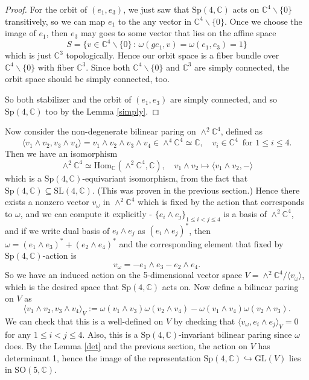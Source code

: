 \documentclass{article}
\newcommand{\SO}{\mathrm{SO}}
\newcommand{\SL}{\mathrm{SL}}
\newcommand{\GL}{\mathrm{GL}}
\newcommand{\Sp}{\mathrm{Sp}}
\newcommand{\Hom}{\mathrm{Hom}}
\begin{document}
\begin{proof}
For the orbit of $(e_{1}, e_{3})$, we just saw that $\Sp(4, \mathbb{C})$ acts on $\mathbb{C}^{4}\backslash\{0\}$ transitively, so we can map $e_{1}$ to the any vector in $\mathbb{C}^{4}\backslash\{0\}$. Once we choose the image of $e_{1}$, then $e_{3}$ may goes to some vector that lies on the affine space $$S = \{v\in \mathbb{C}^{4}\backslash\{0\}\,:\, \omega(ge_{1}, v) = \omega(e_{1}, e_{3})=1\}$$
which is just $\mathbb{C}^{3}$ topologically. 
Hence our orbit space is a fiber bundle over $\mathbb{C}^{4}\backslash\{0\}$ with fiber $\mathbb{C}^{3}$. Since both $\mathbb{C}^{4}\backslash\{0\}$ and $\mathbb{C}^{3}$ are simply connected, the orbit space should be simply connected, too. 

So both stabilizer and the orbit of $(e_{1}, e_{3})$ are simply connected, and so $\Sp(4, \mathbb{C})$ too by the Lemma \ref{simply}. 
\end{proof}
Now consider the  non-degenerate bilinear paring on $\wedge^{2}\mathbb{C}^{4}$, defined as
$$
\langle v_{1}\wedge v_{2}, v_{3}\wedge v_{4}\rangle = v_{1}\wedge v_{2}\wedge v_{3}\wedge v_{4}\in \wedge^{4}\mathbb{C}^{4}\simeq \mathbb{C}, \quad v_{i}\in\mathbb{C}^{4}\,\text{ for }1\leq i\leq 4. 
$$ 
Then we have an isomorphism 
$$
\wedge^{2}\mathbb{C}^{4}\simeq \Hom_{\mathbb{C}}(\wedge^{2}\mathbb{C}^{4}, \mathbb{C}), \quad v_{1}\wedge v_{2}\mapsto \langle v_{1}\wedge v_{2}, -\rangle 
$$
which is a $\Sp(4, \mathbb{C})$-equivariant isomorphism, from the fact that $\Sp(4, \mathbb{C})\subseteq \SL(4, \mathbb{C})$. (This was proven in the previous section.) 
Hence there exists a nonzero vector $v_{\omega}$ in $\wedge^{2}\mathbb{C}^{4}$ which is fixed by the action that corresponds to $\omega$, and we can compute it explicitly - $\{e_{i}\wedge e_{j}\}_{1\leq i<j\leq 4}$ is a basis of $\wedge^{2}\mathbb{C}^{4}$, and if we write dual basis of $e_{i}\wedge e_{j}$ as $(e_{i}\wedge e_{j})^{*}$, then $\omega = (e_{1}\wedge e_{3})^{*}+(e_{2}\wedge e_{4})^{*}$ and the corresponding element that fixed by $\Sp(4, \mathbb{C})$-action is 
$$
v_{\omega} = - e_{1}\wedge e_{3} - e_{2}\wedge e_{4}. 
$$
So we have an induced action on the 5-dimensional vector space $V = \wedge^{2}\mathbb{C}^{4}/\langle v_{\omega}\rangle$, which is the desired space that $\Sp(4, \mathbb{C})$ acts on. 
Now define a bilinear paring on $V$ as
$$
\langle v_{1}\wedge v_{2}, v_{3}\wedge v_{4}\rangle_{V} := \omega(v_{1}\wedge v_{3})\omega(v_{2}\wedge v_{4}) - \omega(v_{1}\wedge v_{4})\omega(v_{2}\wedge v_{3}). 
$$
We can check that this is a well-defined on $V$ by checking that $\langle v_{\omega}, e_{i}\wedge e_{j}\rangle_{V} = 0$ for any $1\leq i<j\leq 4$. Also, this is a $\Sp(4, \mathbb{C})$-invariant bilinear paring since $\omega$ does. 
By the Lemma \ref{det} and the previous section, the action on $V$ has determinant 1, hence the image of the representation $\Sp(4, \mathbb{C})\hookrightarrow \GL(V)$ lies in $\SO(5, \mathbb{C})$. 
\end{document}
